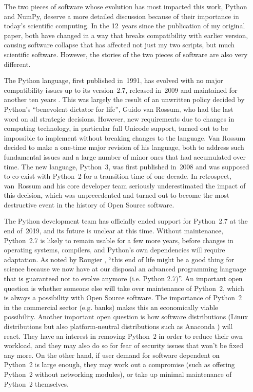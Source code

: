 \vspace{3mm}

The two pieces of software whose evolution has most impacted this work, Python and NumPy, deserve a more detailed discussion because of their importance in today's scientific computing. In the 12~years since the publication of my original paper, both have changed in a way that breaks compatibility with earlier version, causing software collapse \cite{HinsenDealingSoftwareCollapse2019} that has affected not just my two scripts, but much scientific software. However, the stories of the two pieces of software are also very different.

\vspace{1mm}

The Python language, first published in~1991, has evolved with no major compatibility issues up to its version~2.7, released in~2009 and maintained for another ten years \cite{WikipediacommunityHistoryPython2020}. This was largely the result of an unwritten policy decided by Python's ``benevolent dictator for life'', Guido van Rossum, who had the last word on all strategic decisions. However, new requirements due to changes in computing technology, in particular full Unicode support, turned out to be impossible to implement without breaking changes to the language. Van Rossum decided to make a one-time major revision of his language, both to address such fundamental issues and a large number of minor ones that had accumulated over time. The new language, Python~3, was first published in~2008 and was supposed to co-exist with Python~2 for a transition time of one decade. In retrospect, van~Rossum and his core developer team seriously underestimated the impact of this decision, which was unprecedented and turned out to become the most destructive event in the history of Open Source software.

The Python development team has officially ended support for Python~2.7 at the end of~2019, and its future is unclear at this time. Without maintenance, Python~2.7 is likely to remain usable for a few more years, before changes in operating systems, compilers, and Python's own dependencies will require adaptation. As noted by Rougier \cite{RougierRpLoupe2019}, ``this end of life might be a good thing for science because we now have at our disposal an advanced programming language that is guaranteed not to evolve anymore (i.e. Python 2.7)''. An important open question is whether someone else will take over maintenance of Python~2, which is always a possibility with Open Source software. The importance of Python~2 in the commercial sector (e.g. banks) makes this an economically viable possibility. Another important open question is how software distributions (Linux distributions but also platform-neutral distributions such as Anaconda \cite{AnacondaInc.Anacondasoftwaredistribution2020}) will react. They have an interest in removing Python~2 in order to reduce their own workload, and they may also do so for fear of security issues that won't be fixed any more. On the other hand, if user demand for software dependent on Python~2 is large enough, they may work out a compromise (such as offering Python~2 without networking modules), or take up minimal maintenance of Python~2 themselves.


